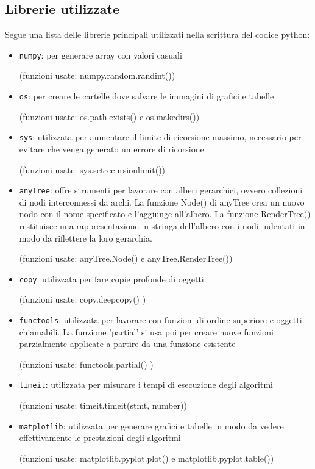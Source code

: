 \documentclass{article}
\begin{document}
\subsection{Librerie utilizzate}
Segue una lista delle librerie principali utilizzati nella scrittura del codice python:

\begin{itemize}
    \item \verb|numpy|: per generare array con valori casuali
    \par (funzioni usate: numpy.random.randint())

    \item \verb|os|: per creare le cartelle dove salvare le immagini di grafici e tabelle
    \par (funzioni usate: os.path.exists() e os.makedirs())

    \item \verb|sys|: utilizzata per aumentare il limite di ricorsione massimo, necessario per evitare che venga generato un errore di ricorsione
    \par (funzioni usate: sys.setrecursionlimit())

    \item \verb|anyTree|: offre strumenti per lavorare con alberi gerarchici, ovvero collezioni di nodi interconnessi da archi. La funzione Node() di anyTree crea un nuovo nodo con il nome specificato e l'aggiunge all'albero. La funzione RenderTree() restituisce una rappresentazione in stringa dell'albero con i nodi indentati in modo da riflettere la loro gerarchia.
    \par (funzioni usate: anyTree.Node() e anyTree.RenderTree())

    \item \verb|copy|: utilizzata per fare copie profonde di oggetti
    \par (funzioni usate: copy.deepcopy() )

    \item \verb|functools|: utilizzata per lavorare con funzioni di ordine superiore e oggetti chiamabili. La funzione 'partial' si usa poi per creare nuove funzioni parzialmente applicate a partire da una funzione esistente
    \par (funzioni usate: functools.partial() )

    \item \verb|timeit|: utilizzata per misurare i tempi di esecuzione degli algoritmi
    \par (funzioni usate: timeit.timeit(stmt, number))
    
    \item \verb|matplotlib|: utilizzata per generare grafici e tabelle in modo da vedere effettivamente le prestazioni degli algoritmi
    \par (funzioni usate: matplotlib.pyplot.plot() e matplotlib.pyplot.table())

\end{itemize}
\end{document}
